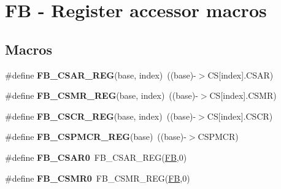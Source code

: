 \hypertarget{group__FB__Register__Accessor__Macros}{}\section{FB -\/ Register accessor macros}
\label{group__FB__Register__Accessor__Macros}
\subsection*{Macros}
\begin{DoxyCompactItemize}
\item 
\#define {\bfseries F\+B\+\_\+\+C\+S\+A\+R\+\_\+\+R\+EG}(base,  index)~((base)-\/$>$CS\mbox{[}index\mbox{]}.C\+S\+AR)\hypertarget{group__FB__Register__Accessor__Macros_gad2d37e6a80e007f96ccc62dcb7adf429}{}\label{group__FB__Register__Accessor__Macros_gad2d37e6a80e007f96ccc62dcb7adf429}

\item 
\#define {\bfseries F\+B\+\_\+\+C\+S\+M\+R\+\_\+\+R\+EG}(base,  index)~((base)-\/$>$CS\mbox{[}index\mbox{]}.C\+S\+MR)\hypertarget{group__FB__Register__Accessor__Macros_ga217b4d27e624164ff7bfeb2ea0055456}{}\label{group__FB__Register__Accessor__Macros_ga217b4d27e624164ff7bfeb2ea0055456}

\item 
\#define {\bfseries F\+B\+\_\+\+C\+S\+C\+R\+\_\+\+R\+EG}(base,  index)~((base)-\/$>$CS\mbox{[}index\mbox{]}.C\+S\+CR)\hypertarget{group__FB__Register__Accessor__Macros_gafcddabc42b1be44a842cdc3280000d99}{}\label{group__FB__Register__Accessor__Macros_gafcddabc42b1be44a842cdc3280000d99}

\item 
\#define {\bfseries F\+B\+\_\+\+C\+S\+P\+M\+C\+R\+\_\+\+R\+EG}(base)~((base)-\/$>$C\+S\+P\+M\+CR)\hypertarget{group__FB__Register__Accessor__Macros_ga9aa09b0b2e81180965cfa719540846dd}{}\label{group__FB__Register__Accessor__Macros_ga9aa09b0b2e81180965cfa719540846dd}

\item 
\#define {\bfseries F\+B\+\_\+\+C\+S\+A\+R0}~F\+B\+\_\+\+C\+S\+A\+R\+\_\+\+R\+EG(\hyperlink{group__FB__Peripheral__Access__Layer_gafa56f653aa38688ca538ba26fcde993c}{FB},0)\hypertarget{group__FB__Register__Accessor__Macros_ga444494eb7e637dcea435c4dc66ed7cd4}{}\label{group__FB__Register__Accessor__Macros_ga444494eb7e637dcea435c4dc66ed7cd4}

\item 
\#define {\bfseries F\+B\+\_\+\+C\+S\+M\+R0}~F\+B\+\_\+\+C\+S\+M\+R\+\_\+\+R\+EG(\hyperlink{group__FB__Peripheral__Access__Layer_gafa56f653aa38688ca538ba26fcde993c}{FB},0)\hypertarget{group__FB__Register__Accessor__Macros_gae35baa34099e965e4d9da6d74c723412}{}\label{group__FB__Register__Accessor__Macros_gae35baa34099e965e4d9da6d74c723412}


\end{DoxyCompactItemize}
